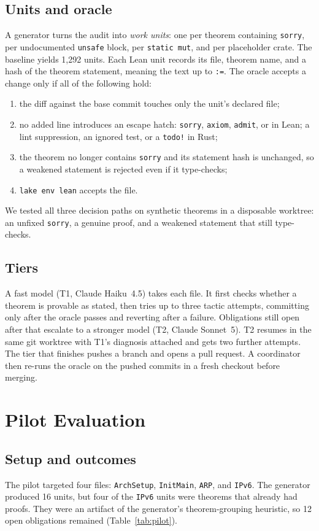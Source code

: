 \documentclass[sigconf,nonacm]{acmart}
\begin{document}
\subsection{Units and oracle}
A generator turns the audit into \emph{work units}: one per theorem containing \texttt{sorry}, per undocumented \texttt{unsafe} block, per \texttt{static mut}, and per placeholder crate. The baseline yields 1{,}292 units. Each Lean unit records its file, theorem name, and a hash of the theorem statement, meaning the text up to \texttt{:=}. The oracle  accepts a change only if all of the following hold:
\begin{enumerate}
\item the diff against the base commit touches only the unit's declared file;
\item no added line introduces an escape hatch: \texttt{sorry}, \texttt{axiom}, \texttt{admit}, or  in Lean; a lint suppression, an ignored test, or a \texttt{todo!} in Rust;
\item the theorem no longer contains \texttt{sorry} and its statement hash is unchanged, so a weakened statement is rejected even if it type-checks;
\item \texttt{lake env lean} accepts the file.
\end{enumerate}
We tested all three decision paths on synthetic theorems in a disposable worktree: an unfixed \texttt{sorry}, a genuine proof, and a weakened statement that still type-checks.

\subsection{Tiers}
A fast model (T1, Claude Haiku~4.5) takes each file. It first checks whether a theorem is provable as stated, then tries up to three tactic attempts, committing only after the oracle passes and reverting after a failure. Obligations still open after that escalate to a stronger model (T2, Claude Sonnet~5). T2 resumes in the same git worktree with T1's diagnosis attached and gets two further attempts. The tier that finishes pushes a branch and opens a pull request. A coordinator then re-runs the oracle on the pushed commits in a fresh checkout before merging.

\section{Pilot Evaluation}\label{sec:pilot}
\subsection{Setup and outcomes}
The pilot targeted four files: \texttt{ArchSetup}, \texttt{InitMain}, \texttt{ARP}, and \texttt{IPv6}. The generator produced 16 units, but four of the \texttt{IPv6} units were theorems that already had proofs. They were an artifact of the generator's theorem-grouping heuristic, so 12 open obligations remained (Table~\ref{tab:pilot}).
\end{document}
